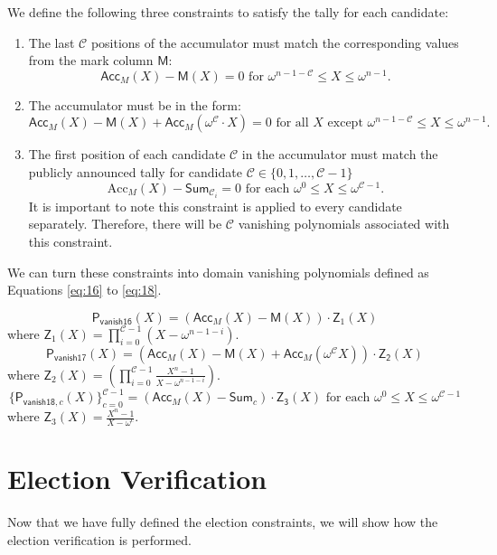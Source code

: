   We define the following three constraints to satisfy the tally for each candidate:
\begin{enumerate}
    \item The last $\mathcal{C}$ positions of the accumulator must match the corresponding values from the mark column $\mathsf{M}$:
    \[
    \mathsf{Acc}_M(X) - \mathsf{M}(X) = 0 \text{ for } \omega^{n-1-\mathcal{C}} \le X \le \omega^{n-1}.
    \]
    \item The accumulator must be in the form:
    \[
    \mathsf{Acc}_M(X)-\mathsf{M}(X)+\mathsf{Acc}_M(\omega^\mathcal{C} \cdot X)=0 \text{ for all } X \text{ except } \omega^{n-1-\mathcal{C}} \le X \le \omega^{n-1}.
    \]
    \item The first position of each candidate $\mathcal{C}$ in the accumulator must match the publicly announced tally for candidate $\mathcal{C}\in\{0,1,\dots,\mathcal{C}-1\}$
    \[
    \mathrm{Acc}_M(X)-\mathsf{Sum}_{\mathcal{C}_i}=0 \text{ for each } \omega^0 \le X \le \omega^{\mathcal{C}-1}.
    \]
    It is important to note this constraint is applied to every candidate separately. Therefore, there will be $\mathcal{C}$ vanishing polynomials associated with this constraint.

\end{enumerate}

We can turn these constraints into domain vanishing polynomials defined as Equations \ref{eq:16} to \ref{eq:18}.

\begin{equation}
  \label{eq:16}
  \mathsf{P_{vanish16}}(X) = (\mathsf{Acc}_M(X)-\mathsf{M}(X)) \cdot \mathsf{Z}_1(X)
\end{equation}
where $\mathsf{Z}_1(X)=\prod_{i=0}^{\mathcal{C}-1} (X - \omega^{n-1 - i})$.
\begin{equation}
  \label{eq:17}
  \mathsf{P_{vanish17}}(X) = (\mathsf{Acc}_M(X) - \mathsf{M}(X) + \mathsf{Acc}_M(\omega^\mathcal{C} X)) \cdot \mathsf{Z_2}(X)
\end{equation}
where $\mathsf{Z}_2(X)=\left(\prod_{i=0}^{\mathcal{C}-1} \frac{X^n - 1}{X - \omega^{n-1 - i}} \right)$.
\begin{equation}
  \label{eq:18}
  \{\mathsf{P}_{\mathsf{vanish18},c}(X)\}_{c=0}^{\mathcal{C}-1} = (\mathsf{Acc}_M(X) - \mathsf{Sum}_c) \cdot \mathsf{Z_3}(X) \text{ for each }\omega^0 \le X \le \omega^{\mathcal{C}-1}
\end{equation}
where $\mathsf{Z}_3(X)= \frac{X^n - 1}{X - \omega^{c}}$. 


\section{Election Verification}
\label{sec:elec}
Now that we have fully defined the election constraints, we will show how the election verification is performed. 

